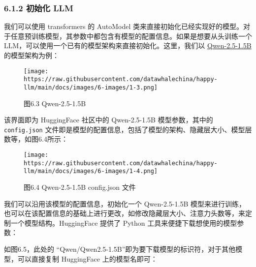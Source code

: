 \documentclass[12pt,a4paper]{book}
\begin{document}
\subsubsection{6.1.2 初始化 LLM}\label{ux521dux59cbux5316-llm}

我们可以使用 transformers 的 AutoModel
类来直接初始化已经实现好的模型。对于任意预训练模型，其参数中都包含有模型的配置信息。如果是想要从头训练一个
LLM，可以使用一个已有的模型架构来直接初始化。这里，我们以
\href{https://huggingface.co/Qwen/Qwen2.5-1.5B/tree/main}{Qwen-2.5-1.5B}的模型架构为例：

\begin{figure}[htbp]\centering
\texttt{[image: https://raw.githubusercontent.com/datawhalechina/happy-llm/main/docs/images/6-images/1-3.png]}
\caption{图6.3 Qwen-2.5-1.5B}
\end{figure}

该界面即为 HuggingFace 社区中的 Qwen-2.5-1.5B 模型参数，其中的
\texttt{config.json}
文件即是模型的配置信息，包括了模型的架构、隐藏层大小、模型层数等，如图6.4所示：

\begin{figure}[htbp]\centering
\texttt{[image: https://raw.githubusercontent.com/datawhalechina/happy-llm/main/docs/images/6-images/1-4.png]}
\caption{图6.4 Qwen-2.5-1.5B config.json 文件}
\end{figure}

我们可以沿用该模型的配置信息，初始化一个 Qwen-2.5-1.5B
模型来进行训练，也可以在该配置信息的基础上进行更改，如修改隐藏层大小、注意力头数等，来定制一个模型结构。HuggingFace
提供了 Python 工具来便捷下载想使用的模型参数：

\begin{Shaded}
\begin{Highlighting}[]
\NormalTok{os.environ[}\NormalTok{] }\OperatorTok{=} 
\NormalTok{)}
\end{Highlighting}
\end{Shaded}

如图6.5，此处的
``Qwen/Qwen2.5-1.5B''即为要下载模型的标识符，对于其他模型，可以直接复制
HuggingFace 上的模型名即可：
\end{document}
